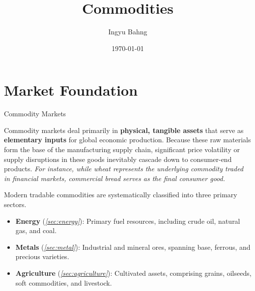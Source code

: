 \documentclass[10pt]{article}
\title{Commodities}
\date{\today}
\author{Ingyu Bahng}
\begin{document}


\section{Market Foundation}

  \begin{core}{Commodity Markets}

    Commodity markets deal primarily in \textbf{physical, tangible assets} that serve as \textbf{elementary inputs} for global economic production. Because these raw materials form the base of the manufacturing supply chain, significant price volatility or supply disruptions in these goods inevitably cascade down to consumer-end products. \textit{For instance, while wheat represents the underlying commodity traded in financial markets, commercial bread serves as the final consumer good.}

    Modern tradable commodities are systematically classified into three primary sectors.

    \begin{itemize}

      \item \textbf{Energy} (\textit{\autoref{sec:energy}}): Primary fuel resources, including crude oil, natural gas, and coal.

      \item \textbf{Metals} (\textit{\autoref{sec:metal}}): Industrial and mineral ores, spanning base, ferrous, and precious varieties.

      \item \textbf{Agriculture} (\textit{\autoref{sec:agriculture}}): Cultivated assets, comprising grains, oilseeds, soft commodities, and livestock.

    \end{itemize}

  \end{core}
  
\end{document}
